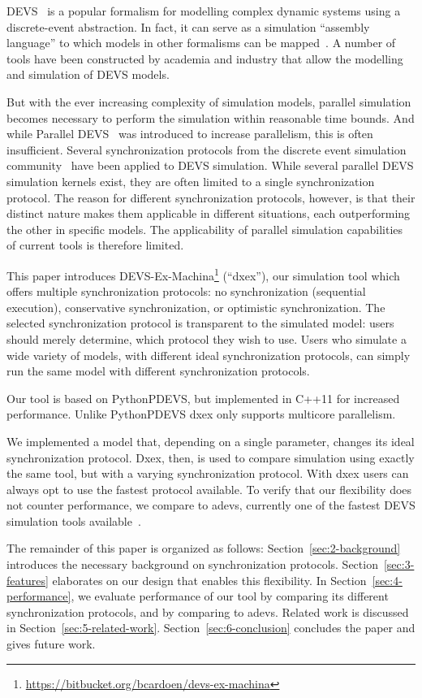 \textsf{DEVS}~\cite{ClassicDEVS} is a popular formalism for modelling complex dynamic systems using a discrete-event abstraction.
In fact, it can serve as a simulation ``assembly language'' to which models in other formalisms can be mapped~\cite{DEVSbase}.
A number of tools have been constructed by academia and industry that allow the modelling and simulation of \textsf{DEVS} models.

But with the ever increasing complexity of simulation models, parallel simulation becomes necessary to perform the simulation within reasonable time bounds.
And while \textsf{Parallel DEVS}~\cite{ParallelDEVS} was introduced to increase parallelism, this is often insufficient.
Several synchronization protocols from the discrete event simulation community~\cite{FujimotoBook} have been applied to \textsf{DEVS} simulation.
While several parallel \textsf{DEVS} simulation kernels exist, they are often limited to a single synchronization protocol.
The reason for different synchronization protocols, however, is that their distinct nature makes them applicable in different situations, each outperforming the other in specific models.
The applicability of parallel simulation capabilities of current tools is therefore limited.

This paper introduces DEVS-Ex-Machina\footnote{\url{https://bitbucket.org/bcardoen/devs-ex-machina}} (``dxex''), our simulation tool which offers multiple synchronization protocols: no synchronization (sequential execution), conservative synchronization, or optimistic synchronization.
The selected synchronization protocol is transparent to the simulated model: users should merely determine, which protocol they wish to use.
Users who simulate a wide variety of models, with different ideal synchronization protocols, can simply run the same model with different synchronization protocols.

Our tool is based on PythonPDEVS, but implemented in C++11 for increased performance.
Unlike PythonPDEVS dxex only supports multicore parallelism.

We implemented a model that, depending on a single parameter, changes its ideal synchronization protocol.
Dxex, then, is used to compare simulation using exactly the same tool, but with a varying synchronization protocol. With dxex users can always opt to use the fastest protocol available.
To verify that our flexibility does not counter performance, we compare to adevs, currently one of the fastest \textsf{DEVS} simulation tools available~\cite{PythonPDEVS,DEVSSurvey}.

The remainder of this paper is organized as follows:
Section~\ref{sec:2-background} introduces the necessary background on synchronization protocols.
Section~\ref{sec:3-features} elaborates on our design that enables this flexibility.
In Section~\ref{sec:4-performance}, we evaluate performance of our tool by comparing its different synchronization protocols, and by comparing to adevs.
Related work is discussed in Section~\ref{sec:5-related-work}.
Section~\ref{sec:6-conclusion} concludes the paper and gives future work.
